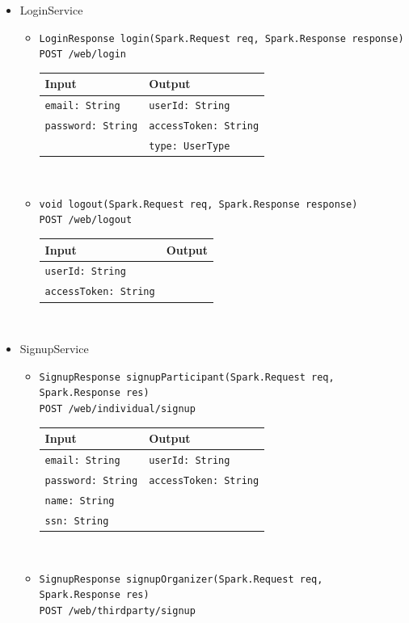 \documentclass[a4paper, hidelinks, 12pt]{report}
\begin{document}
	\begin{itemize}
		\item{LoginService}
		\begin{itemize}
			\item{\verb|LoginResponse login(Spark.Request req, Spark.Response response)|\\ \verb|POST /web/login|}\\
			\begin{tabular}{l | l}
			\textbf{Input} & \textbf{Output} \\
			\hline
			\verb|email: String| & \verb|userId: String| \\
			\verb|password: String| & \verb|accessToken: String| \\
			& \verb|type: UserType| 
			\end{tabular}\\
			\item{\verb|void logout(Spark.Request req, Spark.Response response)|\\ \verb|POST /web/logout|}\\
			\begin{tabular}{l | l}
			\textbf{Input} & \textbf{Output} \\
			\hline
			\verb|userId: String| & \\
			\verb|accessToken: String| & \\
			\end{tabular}\\
		\end{itemize}
		\item{SignupService}
		\begin{itemize}
			\item{\verb|SignupResponse signupParticipant(Spark.Request req, Spark.Response res)|\\ \verb|POST /web/individual/signup|}\\
			\begin{tabular}{l | l}
			\textbf{Input} & \textbf{Output} \\
			\hline
				\verb|email: String| & \verb|userId: String| \\
				\verb|password: String| & \verb|accessToken: String| \\
				\verb|name: String| & \\
				\verb|ssn: String| & \\
			\end{tabular}\\
			\item{\verb|SignupResponse signupOrganizer(Spark.Request req, Spark.Response res)|\\ \verb|POST /web/thirdparty/signup|}\\

\end{itemize}
\end{itemize}
\end{document}
